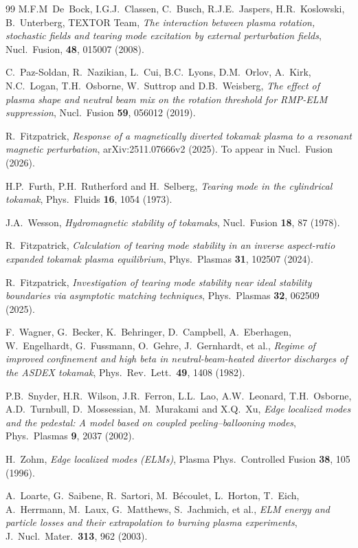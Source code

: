 \documentclass[12pt,prb,aps]{revtex4-1}
\begin{document}
\begin{thebibliography}{99}
 M.F.M~De~Bock, I.G.J.~Classen, C.~Busch, R.J.E.~Jaspers, H.R.~Koslowski, B.~Unterberg, TEXTOR Team,
{\em The interaction between plasma rotation, stochastic fields and tearing mode excitation
 by external perturbation fields}, Nucl.\ Fusion, {\bf 48}, 015007 (2008).

 C.~Paz-Soldan, R.~Nazikian, L.~Cui, B.C.~Lyons, D.M.~Orlov, A.~Kirk,  N.C.~Logan, T.H.~Osborne, W.~Suttrop and D.B.~Weisberg, 
{\em The effect of plasma shape and neutral beam mix on the rotation threshold for RMP-ELM suppression}, Nucl.\ Fusion {\bf 59}, 056012 (2019).

 R.~Fitzpatrick, {\em Response of a magnetically diverted tokamak plasma to a resonant magnetic perturbation},  arXiv:2511.07666v2 (2025). To appear in
Nucl.\ Fusion (2026). 

 H.P.~Furth, P.H.~Rutherford and H.~Selberg, {\em Tearing mode in the cylindrical tokamak}, Phys.\  Fluids {\bf 16}, 1054 (1973). 

 J.A.~Wesson, {\em Hydromagnetic stability of tokamaks}, Nucl.\ Fusion {\bf 18}, 87 (1978).

 R.~Fitzpatrick, {\em Calculation of tearing mode stability in an inverse aspect-ratio expanded tokamak plasma equilibrium}, Phys.\ Plasmas {\bf 31}, 102507 (2024).

 R.~Fitzpatrick, {\em Investigation of tearing mode stability near ideal stability boundaries via asymptotic matching techniques}, Phys.\ Plasmas {\bf 32}, 062509 (2025).

 F.~Wagner, G.~Becker, K.~Behringer, D.~Campbell, A.~Eberhagen, W.~Engelhardt, G.~Fussmann, O.~Gehre, J.~Gernhardt, et al.,
{\em Regime of improved confinement and high beta in neutral-beam-heated divertor discharges of the ASDEX tokamak}, Phys.\ Rev.\ Lett.\ {\bf 49}, 1408   (1982).

 P.B.~Snyder, H.R.~Wilson, J.R.~Ferron, L.L.~Lao, A.W.~Leonard, T.H.~Osborne, A.D.~Turnbull, D.~Mossessian, M.~Murakami and
 X.Q.~Xu, {\em Edge localized modes and the pedestal: A model based on coupled peeling–ballooning modes}, Phys.\ Plasmas {\bf 9}, 2037 (2002).  
  
 H.~Zohm, {\em Edge localized modes (ELMs)}, Plasma Phys.\ Controlled Fusion {\bf 38}, 105 (1996).

 A.~Loarte, G.~Saibene, R.~Sartori, M.~B\'{e}coulet, L.~Horton, T.~Eich, 
A.~Herrmann, M.~Laux, G.~Matthews, S.~Jachmich, et al., {\em ELM energy and particle losses and their extrapolation to burning plasma experiments}, J.\ Nucl.\ Mater.\ {\bf 313}, 962 (2003).


\end{thebibliography}
\end{document}

